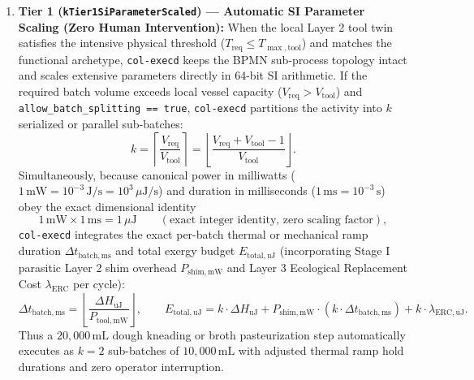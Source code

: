 \begin{enumerate}
    \item \textbf{Tier 1 (\texttt{kTier1SiParameterScaled}) --- Automatic SI Parameter Scaling (Zero Human Intervention):}
    When the local Layer 2 tool twin satisfies the intensive physical threshold ($T_{\mathrm{req}} \le T_{\max,\mathrm{tool}}$) and matches the functional archetype, \texttt{col-execd} keeps the BPMN sub-process topology intact and scales extensive parameters directly in 64-bit SI arithmetic. If the required batch volume exceeds local vessel capacity ($V_{\mathrm{req}} > V_{\mathrm{tool}}$) and \texttt{allow\_batch\_splitting == true}, \texttt{col-execd} partitions the activity into $k$ serialized or parallel sub-batches:
    \begin{equation}
    \label{eq:tier1-batch-split}
    k = \left\lceil \frac{V_{\mathrm{req}}}{V_{\mathrm{tool}}} \right\rceil = \left\lfloor \frac{V_{\mathrm{req}} + V_{\mathrm{tool}} - 1}{V_{\mathrm{tool}}} \right\rfloor.
    \end{equation}
    Simultaneously, because canonical power in milliwatts ($1\,\mathrm{mW} = 10^{-3}\,\mathrm{J/s} = 10^{3}\,\mu\mathrm{J/s}$) and duration in milliseconds ($1\,\mathrm{ms} = 10^{-3}\,\mathrm{s}$) obey the exact dimensional identity
    \begin{equation}
    \label{eq:mw-ms-uj-identity}
    1\,\mathrm{mW} \times 1\,\mathrm{ms} = 1\,\mu\mathrm{J} \qquad (\text{exact integer identity, zero scaling factor}),
    \end{equation}
    \texttt{col-execd} integrates the exact per-batch thermal or mechanical ramp duration $\Delta t_{\mathrm{batch,ms}}$ and total exergy budget $E_{\mathrm{total,uJ}}$ (incorporating Stage I parasitic Layer 2 shim overhead $P_{\mathrm{shim,mW}}$ and Layer 3 Ecological Replacement Cost $\lambda_{\mathrm{ERC}}$ per cycle):
    \begin{equation}
    \label{eq:tier1-thermal-ramp}
    \Delta t_{\mathrm{batch,ms}} = \left\lfloor \frac{\Delta H_{\mathrm{uJ}}}{P_{\mathrm{tool,mW}}} \right\rfloor, \qquad
    E_{\mathrm{total,uJ}} = k \cdot \Delta H_{\mathrm{uJ}} + P_{\mathrm{shim,mW}} \cdot (k \cdot \Delta t_{\mathrm{batch,ms}}) + k \cdot \lambda_{\mathrm{ERC,uJ}}.
    \end{equation}
    Thus a $20{,}000\,\mathrm{mL}$ dough kneading or broth pasteurization step automatically executes as $k = 2$ sub-batches of $10{,}000\,\mathrm{mL}$ with adjusted thermal ramp hold durations and zero operator interruption.


\end{enumerate}
